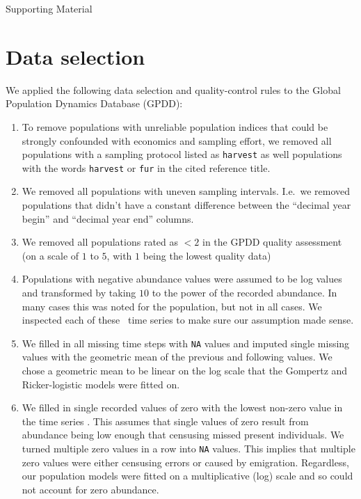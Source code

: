 
\begin{centering}
\LARGE
Supporting Material\\[1.0em]
\end{centering}

\section{Data selection}

We applied the following data selection and quality-control rules to the Global Population Dynamics Database (GPDD):

\begin{enumerate}
\item
  To remove populations with unreliable population indices that could be strongly confounded with economics and sampling effort, we removed all populations with a sampling protocol listed as \texttt{harvest} as well populations with the words \texttt{harvest} or \texttt{fur} in the cited reference title.
\item
  We removed all populations with uneven sampling intervals. I.e.~we removed populations that didn't have a constant difference between the ``decimal year begin'' and ``decimal year end'' columns.
\item
  We removed all populations rated as $< 2$ in the GPDD quality assessment (on a scale of $1$ to $5$, with $1$ being the lowest quality data) \citep[following][]{sibly2005, ziebarth2010}
\item
  Populations with negative abundance values were assumed to be log values and transformed by taking $10$ to the power of the recorded abundance. In many cases this was noted for the population, but not in all cases. We inspected each of these \totalAssumedLog~time series to make sure our assumption made sense.
\item
  We filled in all missing time steps with \texttt{NA} values and imputed single missing values with the geometric mean of the previous and following values. We chose a geometric mean to be linear on the log scale that the Gompertz and Ricker-logistic models were fitted on.
\item
  We filled in single recorded values of zero with the lowest non-zero value in the time series \citep[following][]{brook2006a}. This assumes that single values of zero result from abundance being low enough that censusing missed present individuals. We turned multiple zero values in a row into \texttt{NA} values. This implies that multiple zero values were either censusing errors or caused by emigration. Regardless, our population models were fitted on a multiplicative (log) scale and so could not account for zero abundance.

\end{enumerate}

